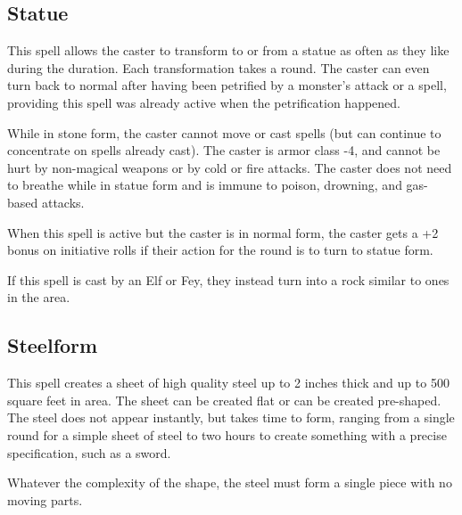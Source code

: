 \begin{multicols*}{2}
\subsection{Statue}\label{spell:Statue}

This spell allows the caster to transform to or from a statue as often as they like during the duration. Each transformation takes a round. The caster can even turn back to normal after having been petrified by a monster’s attack or a spell, providing this spell was already active when the petrification happened.

While in stone form, the caster cannot move or cast spells (but can continue to concentrate on spells already cast). The caster is armor class -4, and cannot be hurt by non-magical weapons or by cold or fire attacks. The caster does not need to breathe while in statue form and is immune to poison, drowning, and gas-based attacks.

When this spell is active but the caster is in normal form, the caster gets a +2 bonus on initiative rolls if their action for the round is to turn to statue form.

If this spell is cast by an Elf or Fey, they instead turn into a rock similar to ones in the area.

\subsection{Steelform}\label{spell:Steelform}

This spell creates a sheet of high quality steel up to 2 inches thick and up to 500 square feet in area. The sheet can be created flat or can be created pre-shaped. The steel does not appear instantly, but takes time to form, ranging from a single round for a simple sheet of steel to two hours to create something with a precise specification, such as a sword.

Whatever the complexity of the shape, the steel must form a single piece with no moving parts.


\end{multicols*}
